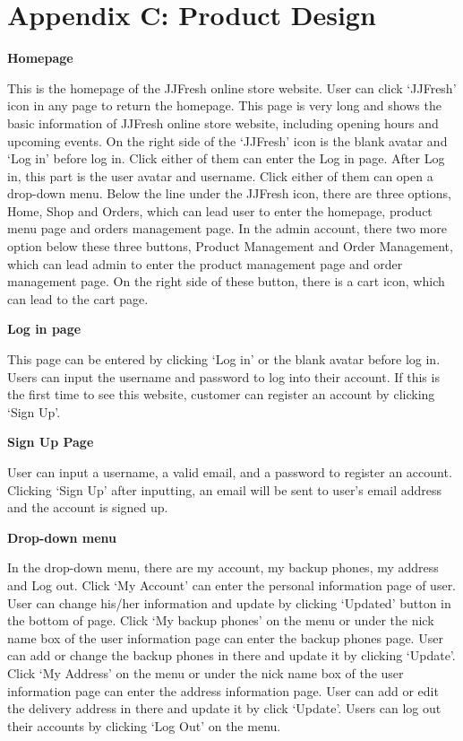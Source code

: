 \chapter*{Appendix C: Product Design}

\textbf{Homepage}

This is the homepage of the JJFresh online store website. User can click ‘JJFresh’ icon in any page to return the homepage.
This page is very long and shows the basic information of JJFresh online store website, including opening hours and upcoming events.
On the right side of the ‘JJFresh’ icon is the blank avatar and ‘Log in’ before log in. Click either of them can enter the Log in page. After Log in, this part is the user avatar and username. Click either of them can open a drop-down menu.
Below the line under the JJFresh icon, there are three options, Home, Shop and Orders, which can lead user to enter the homepage, product menu page and orders management page. In the admin account, there two more option below these three buttons, Product Management and Order Management, which can lead admin to enter the product management page and order management page. On the right side of these button, there is a cart icon, which can lead to the cart page.

\textbf{Log in page}

This page can be entered by clicking ‘Log in’ or the blank avatar before log in. Users can input the username and password to log into their account. If this is the first time to see this website, customer can register an account by clicking ‘Sign Up’.

\textbf{Sign Up Page}

User can input a username, a valid email, and a password to register an account. Clicking ‘Sign Up’ after inputting, an email will be sent to user’s email address and the account is signed up.

\textbf{Drop-down menu}

In the drop-down menu, there are my account, my backup phones, my address and Log out. Click ‘My Account’ can enter the personal information page of user. User can change his/her information and update by clicking ‘Updated’ button in the bottom of page.
Click ‘My backup phones’ on the menu or under the nick name box of the user information page can enter the backup phones page. User can add or change the backup phones in there and update it by clicking ‘Update’.
Click ‘My Address’ on the menu or under the nick name box of the user information page can enter the address information page. User can add or edit the delivery address in there and update it by click ‘Update’. 
Users can log out their accounts by clicking ‘Log Out’ on the menu.

